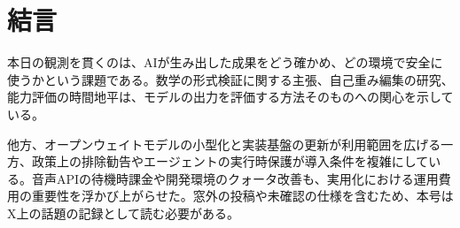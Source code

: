 \section{結言}
本日の観測を貫くのは、AIが生み出した成果をどう確かめ、どの環境で安全に使うかという課題である。数学の形式検証に関する主張、自己重み編集の研究、能力評価の時間地平は、モデルの出力を評価する方法そのものへの関心を示している。

他方、オープンウェイトモデルの小型化と実装基盤の更新が利用範囲を広げる一方、政策上の排除勧告やエージェントの実行時保護が導入条件を複雑にしている。音声APIの待機時課金や開発環境のクォータ改善も、実用化における運用費用の重要性を浮かび上がらせた。窓外の投稿や未確認の仕様を含むため、本号はX上の話題の記録として読む必要がある。
